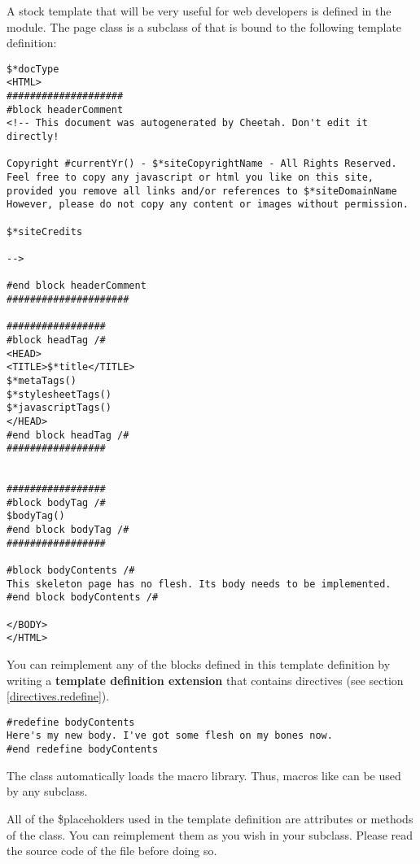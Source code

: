 A stock template that will be very useful for web developers is defined in
the  module.  The  page
class is a subclass of  that is bound to
the following template definition:

\begin{verbatim}
$*docType
<HTML>
####################
#block headerComment
<!-- This document was autogenerated by Cheetah. Don't edit it directly!

Copyright #currentYr() - $*siteCopyrightName - All Rights Reserved.
Feel free to copy any javascript or html you like on this site,
provided you remove all links and/or references to $*siteDomainName
However, please do not copy any content or images without permission.

$*siteCredits

-->

#end block headerComment
#####################

#################
#block headTag /#
<HEAD>
<TITLE>$*title</TITLE>
$*metaTags()
$*stylesheetTags()
$*javascriptTags()
</HEAD>
#end block headTag /#
#################


#################
#block bodyTag /#
$bodyTag()
#end block bodyTag /#
#################

#block bodyContents /#
This skeleton page has no flesh. Its body needs to be implemented.
#end block bodyContents /#

</BODY>
</HTML>
\end{verbatim}

You can reimplement any of the blocks defined in this template definition by
writing a {\bf template definition extension} that contains 
directives (see section \ref{directives.redefine}).

\begin{verbatim}
#redefine bodyContents
Here's my new body. I've got some flesh on my bones now.
#end redefine bodyContents
\end{verbatim}

The  class automatically loads the 
macro library.  Thus, macros like  can be used by any
subclass.

All of the \$placeholders used in the  template definition
are attributes or methods of the  class.  You can reimplement
them as you wish in your subclass.  Please read the source code of the file
 before doing so.  

